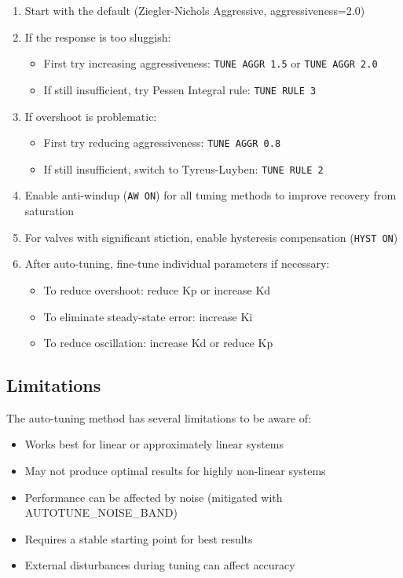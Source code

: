 \documentclass[a4paper,11pt]{article}
\begin{document}
\begin{enumerate}
    \item Start with the default (Ziegler-Nichols Aggressive, aggressiveness=2.0)
    \item If the response is too sluggish:
    \begin{itemize}
        \item First try increasing aggressiveness: \texttt{TUNE AGGR 1.5} or \texttt{TUNE AGGR 2.0}
        \item If still insufficient, try Pessen Integral rule: \texttt{TUNE RULE 3}
    \end{itemize}
    \item If overshoot is problematic:
    \begin{itemize}
        \item First try reducing aggressiveness: \texttt{TUNE AGGR 0.8}
        \item If still insufficient, switch to Tyreus-Luyben: \texttt{TUNE RULE 2}
    \end{itemize}
    \item Enable anti-windup (\texttt{AW ON}) for all tuning methods to improve recovery from saturation
    \item For valves with significant stiction, enable hysteresis compensation (\texttt{HYST ON})
    \item After auto-tuning, fine-tune individual parameters if necessary:
    \begin{itemize}
        \item To reduce overshoot: reduce Kp or increase Kd
        \item To eliminate steady-state error: increase Ki
        \item To reduce oscillation: increase Kd or reduce Kp
    \end{itemize}
\end{enumerate}

\subsection{Limitations}

The auto-tuning method has several limitations to be aware of:

\begin{itemize}
    \item Works best for linear or approximately linear systems
    \item May not produce optimal results for highly non-linear systems
    \item Performance can be affected by noise (mitigated with AUTOTUNE\_NOISE\_BAND)
    \item Requires a stable starting point for best results
    \item External disturbances during tuning can affect accuracy
\end{itemize}
\end{document}
